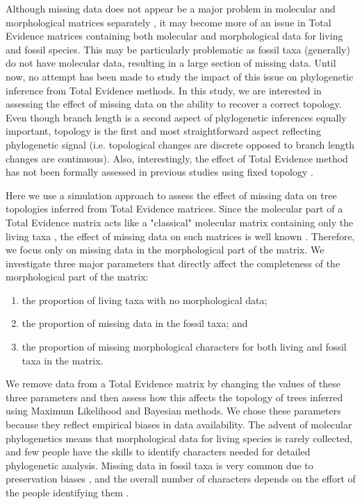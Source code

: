 \documentclass[12pt,letterpaper]{article}
\begin{document}
Although missing data does not appear be a major problem in molecular and morphological matrices separately \citep{wiensmissing2003,wiensmissing2006,wiensmissing2008,rouresite-specific2011,pattinsonphylogeny2014}, it may become more of an issue in Total Evidence matrices containing both molecular and morphological data for living and fossil species. This may be particularly problematic as fossil taxa (generally) do not have molecular data, resulting in a large section of missing data. Until now, no attempt has been made to study the impact of this issue on phylogenetic inference from Total Evidence methods. %
In this study, we are interested in assessing the effect of missing data on the ability to recover a correct topology. Even though branch length is a second aspect of phylogenetic inferences equally important, topology is the first and most straightforward aspect reflecting phylogenetic signal (i.e. topological changes are discrete opposed to branch length changes are continuous). Also, interestingly, the effect of Total Evidence method has not been formally assessed in previous studies using fixed topology \citep{ronquista2012,schragocombining2013}.

Here we use a simulation approach to assess the effect of missing data on tree topologies inferred from Total Evidence matrices. Since the molecular part of a Total Evidence matrix acts like a "classical" molecular matrix containing only the living taxa \citep{ronquista2012}, the effect of missing data on such matrices is well known \citep{wiensmissing2006,wiensmissing2008,rouresite-specific2011}. Therefore, we focus only on missing data in the morphological part of the matrix. We investigate three major parameters that directly affect the completeness of the morphological part of the matrix:
\begin{enumerate}
\item the proportion of living taxa with no morphological data;
\item the proportion of missing data in the fossil taxa; and
\item the proportion of missing morphological characters for both living and fossil taxa in the matrix.
\end{enumerate} 
We remove data from a Total Evidence matrix by changing the values of these three parameters and then assess how this affects the topology of trees inferred using Maximum Likelihood and Bayesian methods. We chose these parameters because they reflect empirical biases in data availability. The advent of molecular phylogenetics means that morphological data for living species is rarely collected, and few people have the skills to identify characters needed for detailed phylogenetic analysis. Missing data in fossil taxa is very common due to preservation biases \citep{sansomfossilization2013}, and the overall number of characters depends on the effort of the people identifying them \citep[e.g.][]{O'Leary08022013}.
\end{document}
